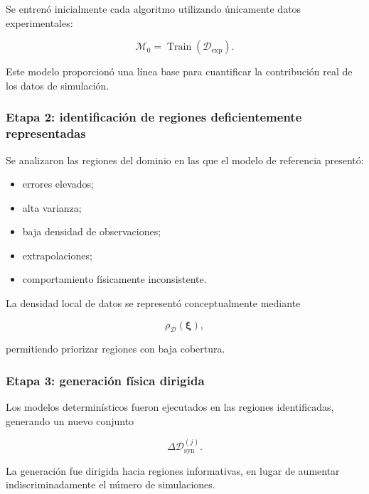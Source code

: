 Se entrenó inicialmente cada algoritmo utilizando únicamente datos experimentales:

\begin{equation}
\mathcal{M}_{0}
=
\operatorname{Train}
\left(
\mathcal{D}_{\mathrm{exp}}
\right).
\end{equation}

Este modelo proporcionó una línea base para cuantificar la contribución real de los datos de simulación.

\subsubsection*{Etapa 2: identificación de regiones deficientemente representadas}

Se analizaron las regiones del dominio en las que el modelo de referencia presentó:

\begin{itemize}
    \item errores elevados;
    \item alta varianza;
    \item baja densidad de observaciones;
    \item extrapolaciones;
    \item comportamiento físicamente inconsistente.
\end{itemize}

La densidad local de datos se representó conceptualmente mediante

\begin{equation}
\rho_{\mathcal{D}}
\left(
\boldsymbol{\xi}
\right),
\end{equation}

permitiendo priorizar regiones con baja cobertura.

\subsubsection*{Etapa 3: generación física dirigida}

Los modelos determinísticos fueron ejecutados en las regiones identificadas, generando un nuevo conjunto

\begin{equation}
\Delta\mathcal{D}_{\mathrm{syn}}^{(j)}.
\end{equation}

La generación fue dirigida hacia regiones informativas, en lugar de aumentar indiscriminadamente el número de simulaciones.

